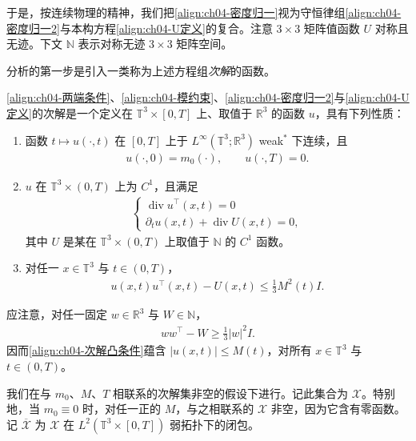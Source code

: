 ﻿\documentclass[../../main.tex]{subfiles}
\begin{document}
于是，按连续物理的精神，我们把\eqref{align:ch04-密度归一}视为守恒律组\eqref{align:ch04-密度归一2}与本构方程\eqref{align:ch04-U定义}的复合。注意 $3\times 3$ 矩阵值函数 $U$ 对称且无迹。下文 $\mathbb{N}$ 表示对称无迹 $3\times 3$ 矩阵空间。

分析的第一步是引入一类称为上述方程组\emph{次解}的函数。

\eqref{align:ch04-两端条件}、\eqref{align:ch04-模约束}、\eqref{align:ch04-密度归一2}与\eqref{align:ch04-U定义}的次解是一个定义在 $\mathbb{T}^{3}\times[0,T]$ 上、取值于 $\mathbb{R}^{3}$ 的函数 $u$，具有下列性质：
\begin{enumerate}
\item\label{item:ch04-次解-a} 函数 $t\mapsto u(\cdot,t)$ 在 $[0,T]$ 上于 $L^{\infty}(\mathbb{T}^{3};\mathbb{R}^{3})$ weak$^{*}$ 下连续，且
\begin{align}
u(\cdot,0)=m_{0}(\cdot),\qquad u(\cdot,T)=0.
\label{align:ch04-次解边界}
\end{align}
\item\label{item:ch04-次解-b} $u$ 在 $\mathbb{T}^{3}\times(0,T)$ 上为 $C^{1}$，且满足
\begin{align}
\begin{cases}
\operatorname{div}u^{\top}(x,t)=0\\
\partial_{t}u(x,t)+\operatorname{div}U(x,t)=0,
\end{cases}
\label{align:ch04-次解方程}
\end{align}
其中 $U$ 是某在 $\mathbb{T}^{3}\times(0,T)$ 上取值于 $\mathbb{N}$ 的 $C^{1}$ 函数。
\item\label{item:ch04-次解-c} 对任一 $x\in\mathbb{T}^{3}$ 与 $t\in(0,T)$，
\begin{align}
u(x,t)u^{\top}(x,t)-U(x,t)\leqslant\tfrac{1}{3}M^{2}(t)I.
\label{align:ch04-次解凸条件}
\end{align}
\end{enumerate}

应注意，对任一固定 $w\in\mathbb{R}^{3}$ 与 $W\in\mathbb{N}$，
\begin{align}
ww^{\top}-W\geqslant\tfrac{1}{3}|w|^{2}I.
\label{align:ch04-凸性恒等式}
\end{align}
因而\eqref{align:ch04-次解凸条件}蕴含 $|u(x,t)|\leqslant M(t)$，对所有 $x\in\mathbb{T}^{3}$ 与 $t\in(0,T)$。

我们在与 $m_{0}$、$M$、$T$ 相联系的次解集非空的假设下进行。记此集合为 $\mathscr{X}$。特别地，当 $m_{0}\equiv 0$ 时，对任一正的 $M$，与之相联系的 $\mathscr{X}$ 非空，因为它含有零函数。记 $\overline{\mathscr{X}}$ 为 $\mathscr{X}$ 在 $L^{2}(\mathbb{T}^{3}\times[0,T])$ 弱拓扑下的闭包。
\end{document}
